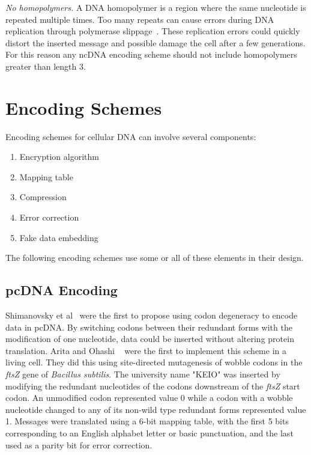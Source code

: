 \documentclass[USenglish,oneside,twocolumn]{article}
\begin{document}
\textit{No homopolymers.} A DNA homopolymer is a region where the same nucleotide is repeated multiple times. Too many repeats can cause errors during DNA replication through polymerase slippage~\cite{VCE2001TEJ}. These replication errors could quickly distort the inserted message and possible damage the cell after a few generations. For this reason any ncDNA encoding scheme should not include homopolymers greater than length 3.


\section{Encoding Schemes}

Encoding schemes for cellular DNA can involve several components:

\begin{enumerate}
\item Encryption algorithm
\item Mapping table
\item Compression
\item Error correction
\item Fake data embedding
\end{enumerate}

The following encoding schemes use some or all of these elements in their design.

\subsection{pcDNA Encoding}

Shimanovsky et al~\cite{SFHC2003BL} were the first to propose using codon degeneracy to encode data in pcDNA. By switching codons between their redundant forms with the modification of one nucleotide, data could be inserted without altering protein translation. Arita and Ohashi ~\cite{AY2004BP} were the first to implement this scheme in a living cell. They did this using site-directed mutagenesis of wobble codons in the \textit{ftsZ} gene of \textit{Bacillus subtilis}. The university name "KEIO" was inserted by modifying the redundant nucleotides of the codons downstream of the \textit{ftsZ} start codon. An unmodified codon represented value 0 while a codon with a wobble nucleotide changed to any of its non-wild type redundant forms represented value 1. Messages were translated using a 6-bit mapping table, with the first 5 bits corresponding to an English alphabet letter or basic punctuation, and the last used as a parity bit for error correction.
\end{document}
